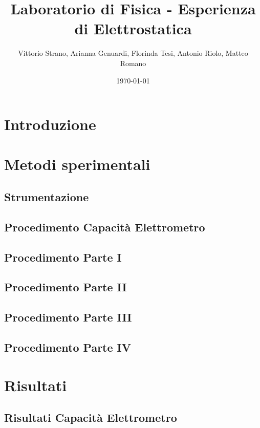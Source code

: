 \documentclass{article}
\title{Laboratorio di Fisica - Esperienza di Elettrostatica}
\author{Vittorio Strano, Arianna Genuardi, Florinda Tesi, Antonio Riolo, Matteo Romano}
\date{\today}
\begin{document}
    \maketitle

    \tableofcontents

    \newpage
    \normalsize
    
    
    \section{Introduzione}
     
    
    \section{Metodi sperimentali}
    \subsection{Strumentazione}
     
    \subsection{Procedimento Capacità Elettrometro}
    \subsection{Procedimento Parte I}
    \subsection{Procedimento Parte II}
    \subsection{Procedimento Parte III}
    \subsection{Procedimento Parte IV}
    
    \section{Risultati}
    \subsection{Risultati Capacità Elettrometro}
\end{document}

